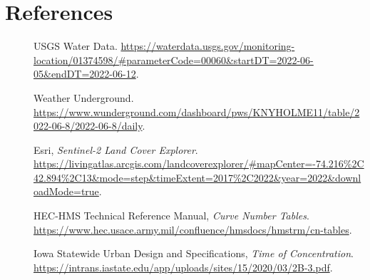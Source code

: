 \documentclass{article}
\begin{document}
\section{References}
\begin{description}
    \item[]  USGS Water Data. \url{https://waterdata.usgs.gov/monitoring-location/01374598/#parameterCode=00060&startDT=2022-06-05&endDT=2022-06-12}.
    \item[]  Weather Underground. \url{https://www.wunderground.com/dashboard/pws/KNYHOLME11/table/2022-06-8/2022-06-8/daily}.
    \item[]  Esri, \emph{Sentinel-2 Land Cover Explorer}. \url{https://livingatlas.arcgis.com/landcoverexplorer/#mapCenter=-74.216%2C42.894%2C13&mode=step&timeExtent=2017%2C2022&year=2022&downloadMode=true}.
    \item[]  HEC-HMS Technical Reference Manual, \emph{Curve Number Tables}. \url{https://www.hec.usace.army.mil/confluence/hmsdocs/hmstrm/cn-tables}.
    \item[]  Iowa Statewide Urban Design and Specifications, \emph{Time of Concentration}. \url{https://intrans.iastate.edu/app/uploads/sites/15/2020/03/2B-3.pdf}.
\end{description}
\newpage
\end{document}
